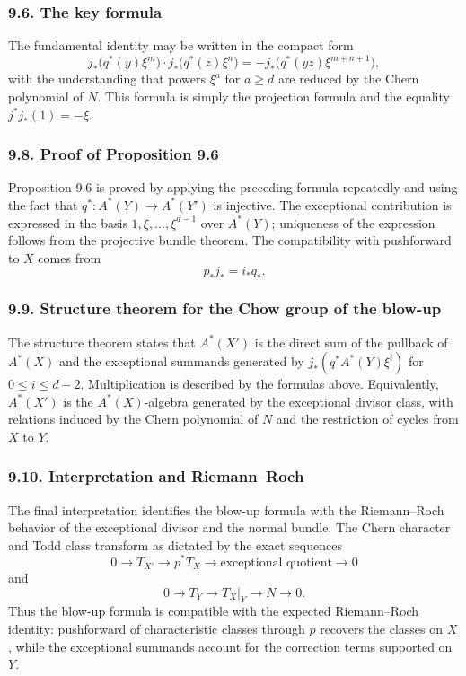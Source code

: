 \documentclass[14pt]{extarticle}
\begin{document}
\subsubsection*{9.6. The key formula}

The fundamental identity may be written in the compact form
\[
   j_*\bigl(q^*(y)\xi^m\bigr)\cdot j_*\bigl(q^*(z)\xi^n\bigr)
     =-j_*\bigl(q^*(yz)\xi^{m+n+1}\bigr),
\]
with the understanding that powers $\xi^a$ for $a\ge d$ are reduced by the Chern polynomial of $N$. This formula is simply the projection formula and the equality $j^*j_*(1)=-\xi$.

\subsubsection*{9.8. Proof of Proposition 9.6}

Proposition 9.6 is proved by applying the preceding formula repeatedly and using the fact that $q^*:A^*(Y)\to A^*(Y')$ is injective. The exceptional contribution is expressed in the basis $1,\xi,\ldots,\xi^{d-1}$ over $A^*(Y)$; uniqueness of the expression follows from the projective bundle theorem. The compatibility with pushforward to $X$ comes from
\[
   p_*j_*=i_*q_*.
\]

\subsubsection*{9.9. Structure theorem for the Chow group of the blow-up}

The structure theorem states that $A^*(X')$ is the direct sum of the pullback of $A^*(X)$ and the exceptional summands generated by $j_*(q^*A^*(Y)\xi^i)$ for $0\le i\le d-2$. Multiplication is described by the formulas above. Equivalently, $A^*(X')$ is the $A^*(X)$-algebra generated by the exceptional divisor class, with relations induced by the Chern polynomial of $N$ and the restriction of cycles from $X$ to $Y$.

\subsubsection*{9.10. Interpretation and Riemann--Roch}

The final interpretation identifies the blow-up formula with the Riemann--Roch behavior of the exceptional divisor and the normal bundle. The Chern character and Todd class transform as dictated by the exact sequences
\[
   0\to T_{X'}\to p^*T_X\to \text{exceptional quotient}\to0
\]
and
\[
   0\to T_Y\to T_X|_Y\to N\to0.
\]
Thus the blow-up formula is compatible with the expected Riemann--Roch identity: pushforward of characteristic classes through $p$ recovers the classes on $X$, while the exceptional summands account for the correction terms supported on $Y$.
\end{document}
